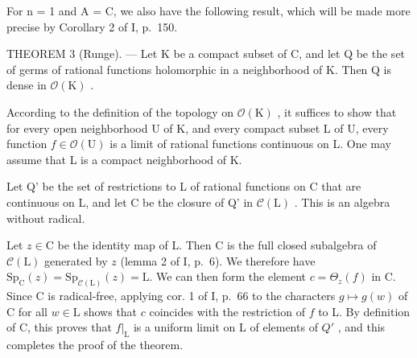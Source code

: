 For n = 1 and A = C, we also have the following result, which will be made more precise by Corollary 2 of I, p.~150.

THEOREM 3 (Runge). --- Let K be a compact subset of C, and let Q be the set of germs of rational functions holomorphic in a neighborhood of K. Then Q is dense in \(\mathcal{O}(\mathrm{K})\) .

According to the definition of the topology on \(\mathcal{O}(\mathrm{K})\) , it suffices to show that for every open neighborhood U of K, and every compact subset L of U, every function \(f \in \mathcal{O}(\mathrm{U})\) is a limit of rational functions continuous on L. One may assume that L is a compact neighborhood of K.

Let Q' be the set of restrictions to L of rational functions on C that are continuous on L, and let C be the closure of Q' in \(\mathcal{C}(\mathrm{L})\) . This is an algebra without radical.

Let \(z \in \mathrm{C}\) be the identity map of L. Then C is the full closed subalgebra of \(\mathcal{C}(\mathrm{L})\) generated by \(z\) (lemma 2 of I, p.~6). We therefore have \(\mathrm{Sp}_{\mathrm{C}}(z) = \mathrm{Sp}_{\mathcal{C}(\mathrm{L})}(z) = \mathrm{L}\). We can then form the element \(c = \Theta_z(f)\) in C. Since C is radical-free, applying cor. 1 of I, p.~66 to the characters \(g \mapsto g(w)\) of C for all \(w \in \mathrm{L}\) shows that \(c\) coincides with the restriction of \(f\) to L. By definition of C, this proves that \(f|_{\mathrm{L}}\) is a uniform limit on L of elements of \(Q'\) , and this completes the proof of the theorem.

